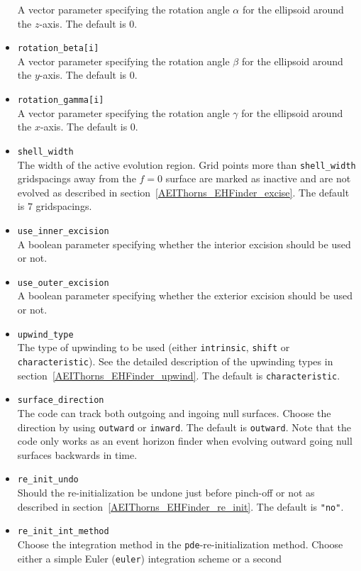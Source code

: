 \begin{itemize}
  A vector parameter specifying the rotation angle $\alpha$ for the ellipsoid
  around the $z$-axis. The default is 0.
\item {\tt rotation\_beta[i]} \\
  A vector parameter specifying the rotation angle $\beta$ for the ellipsoid
  around the $y$-axis. The default is 0.
\item {\tt rotation\_gamma[i]} \\
  A vector parameter specifying the rotation angle $\gamma$ for the ellipsoid
  around the $x$-axis. The default is 0.
\item {\tt shell\_width} \\
  The width of the active evolution region. Grid points more than
  {\tt shell\_width} gridspacings away from the $f=0$ surface are marked
  as inactive and are not evolved as described in
  section~\ref{AEIThorns_EHFinder_excise}. The default is $7$
  gridspacings.
\item {\tt use\_inner\_excision} \\
  A boolean parameter specifying whether the interior excision should be
  used or not.
\item {\tt use\_outer\_excision} \\
  A boolean parameter specifying whether the exterior excision should be
  used or not.
\item {\tt upwind\_type} \\
  The type of upwinding to be used (either {\tt intrinsic}, {\tt shift} or 
  {\tt characteristic}). See the detailed description of the upwinding types
  in section~\ref{AEIThorns_EHFinder_upwind}. The default is 
  {\tt characteristic}.
\item {\tt surface\_direction} \\
  The code can track both outgoing and ingoing null surfaces. Choose the 
  direction by using {\tt outward} or {\tt inward}. The default is
  {\tt outward}. Note that the code only works as an event horizon finder
  when evolving outward going null surfaces backwards in time.
\item {\tt re\_init\_undo} \\
  Should the re-initialization be undone just before pinch-off or not as
  described in section~\ref{AEIThorns_EHFinder_re_init}. The
  default is {\tt "no"}.
\item {\tt re\_init\_int\_method} \\
  Choose the integration method in the {\tt pde}-re-initialization method.
  Choose either a simple Euler ({\tt euler}) integration scheme or a second

\end{itemize}
